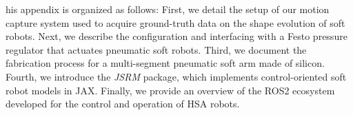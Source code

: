 \newpage

his appendix is organized as follows: First, we detail the setup of our motion capture system used to acquire ground-truth data on the shape evolution of soft robots. Next, we describe the configuration and interfacing with a Festo pressure regulator that actuates pneumatic soft robots. Third, we document the fabrication process for a multi-segment pneumatic soft arm made of silicon. Fourth, we introduce the \emph{JSRM} package, which implements control-oriented soft robot models in JAX. Finally, we provide an overview of the ROS2 ecosystem developed for the control and operation of \gls{HSA} robots.

